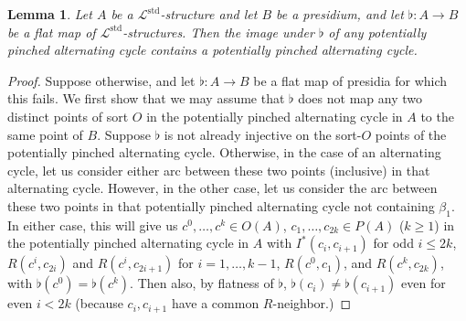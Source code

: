 \documentclass{amsart}
\newtheorem{lemma}[theorem]{Lemma}
\theoremstyle{definition}
\theoremstyle{remark}
\numberwithin{equation}{section}
\begin{document}
\begin{lemma}
    \label{potentially pinched alternating cycle preserved under flat map} Let $A$ be a $\mathcal{L}^{\mathrm{std}}$-structure and let $B$ be a presidium, and let $\flat: A \to B$ be a flat map of $\mathcal{L}^{\mathrm{std}}$-structures. Then the image under $\flat$ of any potentially pinched alternating cycle contains a potentially pinched alternating cycle.
\end{lemma}

\begin{proof}
    Suppose otherwise, and let $\flat: A \to B$ be a flat map of presidia for which this fails. We first show that we may assume that $\flat$ does not map any two distinct points of sort $O$ in the potentially pinched alternating cycle in $A$ to the same point of $B$.  Suppose $\flat$ is not already injective on the sort-$O$ points of the potentially pinched alternating cycle. Otherwise, in the case of an alternating cycle, let us consider either arc between these two points (inclusive) in that alternating cycle. However, in the other case, let us consider the arc between these two points in that potentially pinched alternating cycle not containing $\beta_1$. In either case, this will give us $c^{0}, \ldots, c^k \in O(A) $, $c_{1}, \ldots, c_{2k} \in P(A)$ ($k \geq 1$)  in the potentially pinched alternating cycle in $A$ with $I^{*}(c_i, c_{i+1} )$ for odd $i \leq 2k$, $R(c^i, c_{2i})$ and $R(c^i, c_{2i+1})$ for $i = 1, \ldots, k-1$, $R(c^0, c_1)$, and $R(c^k, c_{2k})$, with $\flat(c^0)=\flat(c^k)$. Then also, by flatness of $\flat$, $\flat(c_i) \neq \flat(c_{i+1}) $ even for even $i < 2k$ (because $c_{i}, c_{i+1}$ have a common $R$-neighbor.)
    

\end{proof}
\end{document}
